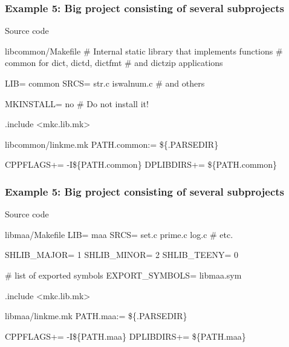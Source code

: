 \documentclass[hyperref={colorlinks=true}]{beamer}
\begin{document}
\begin{frame}[fragile]
  \frametitle{Example 5: Big project consisting of several subprojects}

  \begin{block}{Source code}
  \begin{Code}{libcommon/Makefile}
# Internal static library that implements functions
# common for dict, dictd, dictfmt
# and dictzip applications

LIB=            common
SRCS=           str.c iswalnum.c # and others

MKINSTALL=      no # Do not install it!

.include <mkc.lib.mk>
  \end{Code}
  \begin{Code}{libcommon/linkme.mk}
PATH.common:=      \$\{.PARSEDIR\}

CPPFLAGS+=      -I\$\{PATH.common\}
DPLIBDIRS+=     \$\{PATH.common\}
  \end{Code}
  \end{block}
\end{frame}

\begin{frame}[fragile]
  \frametitle{Example 5: Big project consisting of several subprojects}

  \begin{block}{Source code}
  \begin{Code}{libmaa/Makefile}
LIB=            maa
SRCS=           set.c prime.c log.c # etc.

SHLIB_MAJOR=    1
SHLIB_MINOR=    2
SHLIB_TEENY=    0

# list of exported symbols
EXPORT_SYMBOLS= libmaa.sym

.include <mkc.lib.mk>
  \end{Code}
  \begin{Code}{libmaa/linkme.mk}
PATH.maa:=      \$\{.PARSEDIR\}

CPPFLAGS+=      -I\$\{PATH.maa\}
DPLIBDIRS+=     \$\{PATH.maa\}
  \end{Code}
  \end{block}
\end{frame}
\end{document}
